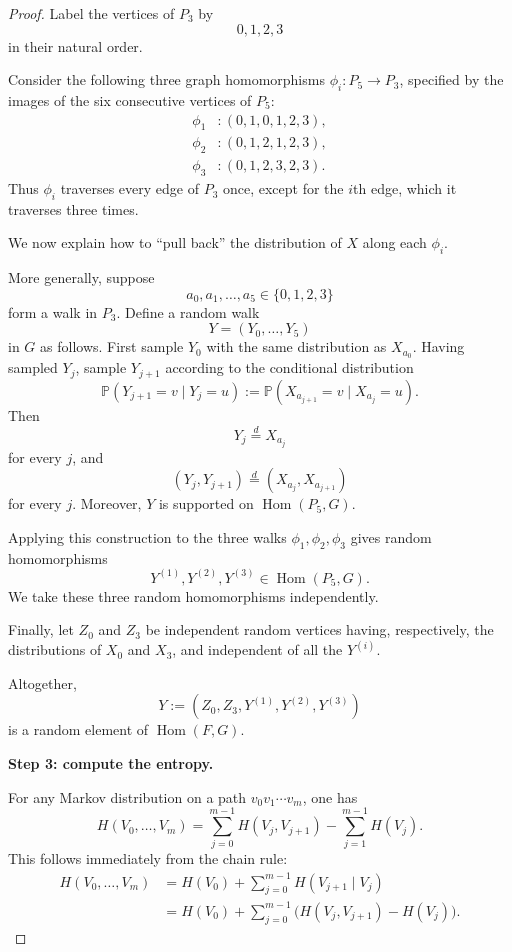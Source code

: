 \documentclass[11pt]{article}
\DeclareMathOperator{\Hom}{Hom}
\begin{document}
\begin{proof}
Label the vertices of $P_3$ by
\[
    0,1,2,3
\]
in their natural order.

Consider the following three graph homomorphisms
$\phi_i:P_5\to P_3$, specified by the images of the six consecutive
vertices of $P_5$:
\[
\begin{aligned}
    \phi_1 &: (0,1,0,1,2,3),\\
    \phi_2 &: (0,1,2,1,2,3),\\
    \phi_3 &: (0,1,2,3,2,3).
\end{aligned}
\]
Thus $\phi_i$ traverses every edge of $P_3$ once, except for the
$i$th edge, which it traverses three times.

We now explain how to ``pull back'' the distribution of $X$ along
each $\phi_i$.

More generally, suppose
\[
    a_0,a_1,\dots,a_5\in\{0,1,2,3\}
\]
form a walk in $P_3$.  Define a random walk
\[
    Y=(Y_0,\dots,Y_5)
\]
in $G$ as follows.  First sample $Y_0$ with the same distribution as
$X_{a_0}$.  Having sampled $Y_j$, sample $Y_{j+1}$ according to the
conditional distribution
\[
    \mathbb P(Y_{j+1}=v\mid Y_j=u)
    :=
    \mathbb P(X_{a_{j+1}}=v\mid X_{a_j}=u).
\]
Then
\[
    Y_j\stackrel{d}{=}X_{a_j}
\]
for every $j$, and
\[
    (Y_j,Y_{j+1})
    \stackrel{d}{=}
    (X_{a_j},X_{a_{j+1}})
\]
for every $j$.
Moreover, $Y$ is supported on $\Hom(P_5,G)$.

Applying this construction to the three walks $\phi_1,\phi_2,\phi_3$
gives random homomorphisms
\[
    Y^{(1)},Y^{(2)},Y^{(3)}\in\Hom(P_5,G).
\]
We take these three random homomorphisms independently.

Finally, let $Z_0$ and $Z_3$ be independent random vertices having,
respectively, the distributions of $X_0$ and $X_3$, and independent
of all the $Y^{(i)}$.

Altogether,
\[
    Y:=(Z_0,Z_3,Y^{(1)},Y^{(2)},Y^{(3)})
\]
is a random element of $\Hom(F,G)$.

\medskip

\noindent
\textbf{Step 3: compute the entropy.}

For any Markov distribution on a path
$v_0v_1\cdots v_m$, one has
\begin{equation}\label{eq:tree-entropy}
    H(V_0,\dots,V_m)
    =
    \sum_{j=0}^{m-1}H(V_j,V_{j+1})
    -
    \sum_{j=1}^{m-1}H(V_j).
\end{equation}
This follows immediately from the chain rule:
\[
\begin{aligned}
H(V_0,\dots,V_m)
&=
H(V_0)+\sum_{j=0}^{m-1}H(V_{j+1}\mid V_j)\\
&=
H(V_0)+\sum_{j=0}^{m-1}
    \bigl(H(V_j,V_{j+1})-H(V_j)\bigr).
\end{aligned}
\]


\end{proof}
\end{document}
